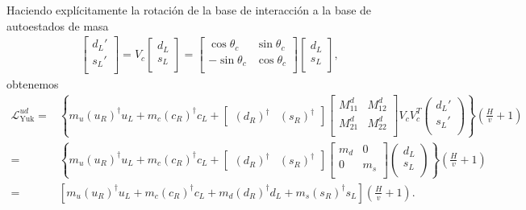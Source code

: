 \begin{frame}
Haciendo explícitamente la rotación de la base de interacción a la base de autoestados de masa
\begin{align}
  \begin{bmatrix}
    d_L'\\
    s_L'\\
  \end{bmatrix}= V_c
  \begin{bmatrix}
    d_L\\
    s_L\\
  \end{bmatrix}=\begin{bmatrix}
    \cos\theta_c & \sin\theta_c\\
    - \sin\theta_c & \cos\theta_c  \\
  \end{bmatrix}  \begin{bmatrix}
    d_L\\
    s_L\\
  \end{bmatrix},
\end{align}
obtenemos
\begin{align}
  \mathcal{L}_{\text{Yuk}}^{ud}
=&\left\{ m_u\left( u_R \right)^{\dagger} u_L+m_c \left( c_R \right)^{\dagger}c_L
+\begin{bmatrix}
     \left( d_R \right)^{\dagger} &  \left( s_R \right)^{\dagger}
   \end{bmatrix}
   \begin{bmatrix}
     M^{d}_{11} & M^{d}_{12} \\
     M^{d}_{21} & M^{d}_{22} \\                                      
  \end{bmatrix} V_c V_c^T
  \begin{pmatrix}
    d_L'\\
    s_L'\\
  \end{pmatrix}
     \right\}
   \left( \frac{H}{v} +1\right) \nonumber\\
=&\left\{ m_u\left( u_R \right)^{\dagger} u_L+m_c \left( c_R \right)^{\dagger}c_L
+\begin{bmatrix}
     \left( d_R \right)^{\dagger} &  \left( s_R \right)^{\dagger}
   \end{bmatrix}
   \begin{bmatrix}
     m_d & 0 \\
     0 & m_s \\                                      
  \end{bmatrix} 
  \begin{pmatrix}
    d_L\\
    s_L\\
  \end{pmatrix}
     \right\}
   \left( \frac{H}{v} +1\right) \nonumber\\
=&\left[ m_u\left( u_R \right)^{\dagger} u_L+m_c \left( c_R \right)^{\dagger}c_L
+m_d\left( d_R \right)^{\dagger}d_L+ m_s \left( s_R \right)^{\dagger}s_L 
     \right]
   \left( \frac{H}{v} +1\right).
\end{align}


\end{frame}
